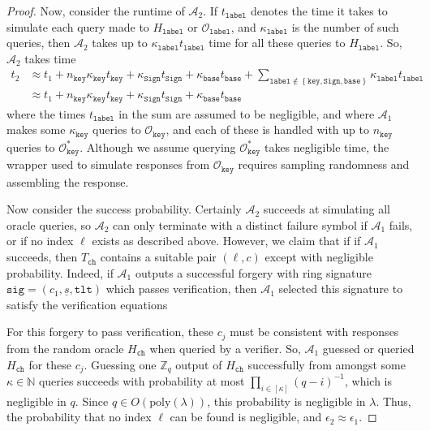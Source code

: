 \documentclass[11pt]{article}
\theoremstyle{definition}
\newcommand{\N}{\bbn}
\newcommand{\tlt}{\texttt{tlt}}
\newcommand{\sig}{\texttt{sig}}
\newcommand{\Zq}{\mathbb{Z}_q}
\newcommand{\bbn}{\mathbb{N}}
\newcommand{\secpar}{\lambda}
\newcommand{\sign}{\texttt{Sign}}
\newcommand{\polysecpar}{O(\text{poly}(\secpar))}
\newcommand{\keyOracle}{\mathcal{O}_{\texttt{key}}}
\begin{document}
\begin{proof}
Now, consider the runtime of $\mathcal{A}_2$. If $t_{\texttt{label}}$ denotes the time it takes to simulate each query made to $H_{\texttt{label}}$ or $\mathcal{O}_{\texttt{label}}$, and $\kappa_{\texttt{label}}$ is the number of such queries, then $\mathcal{A}_2$ takes up to $\kappa_{\texttt{label}}t_{\texttt{label}}$ time for all these queries to $H_{\texttt{label}}$. So, $\mathcal{A}_2$ takes time
\begin{align*}
t_2 &\approx  t_1 + n_{\texttt{key}}\kappa_{\texttt{key}}t_{\texttt{key}} + \kappa_{\sign}t_{\sign} +  \kappa_{\texttt{base}}t_{\texttt{base}} + \sum_{\texttt{label} \notin \left\{\texttt{key}, \sign, \texttt{base}\right\} }\kappa_{\texttt{label}} t_{\texttt{label}} \\
&\approx  t_1 + n_{\texttt{key}}\kappa_{\texttt{key}}t_{\texttt{key}} + \kappa_{\sign}t_{\sign} +  \kappa_{\texttt{base}}t_{\texttt{base}}
\end{align*}where the times $t_{\texttt{label}}$ in the sum are assumed to be negligible, and where $\mathcal{A}_1$ makes some $\kappa_{\texttt{key}}$ queries to $\keyOracle$, and each of these is handled with up to $n_{\texttt{key}}$ queries to $\keyOracle^*$. Although we assume querying $\keyOracle^*$ takes negligible time, the wrapper used to simulate responses from $\keyOracle$ requires sampling randomness and assembling the response. 

Now consider the success probability. Certainly $\mathcal{A}_2$ succeeds at simulating all oracle queries, so $\mathcal{A}_2$ can only terminate with a distinct failure symbol if $\mathcal{A}_1$ fails, or if no index $\ell$ exists as described above.
However, we claim that if if $\mathcal{A}_1$ succeeds, then $T_{\texttt{ch}}$ contains a suitable pair $(\ell,  c)$ except with negligible probability. Indeed, if $\mathcal{A}_1$ outputs a successful forgery with ring signature $\sig = (c_1, \underline{s}, \tlt)$ which passes verification, then $\mathcal{A}_1$ selected this signature to satisfy the verification equations

For this forgery to pass verification, these $c_j$ must be consistent with responses from the random oracle $H_{\texttt{ch}}$ when queried by a verifier. So, $\mathcal{A}_1$ guessed or queried $H_{\texttt{ch}}$ for these $c_j$.
Guessing one $\Zq$ output of $H_{\texttt{ch}}$ successfully from amongst some $\kappa \in \N$ queries succeeds with probability at most $\prod_{i \in [\kappa]} (q-i)^{-1}$, which is negligible in $q$.  Since $q \in \polysecpar$, this probability is negligible in $\secpar$. Thus, the probability that no index $\ell$ can be found is negligible, and $\epsilon_2 \approx \epsilon_1$. 







\end{proof}
\end{document}
